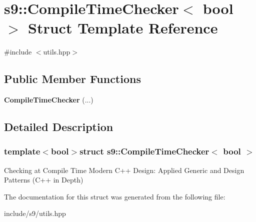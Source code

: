 \hypertarget{structs9_1_1CompileTimeChecker}{\section{s9\-:\-:Compile\-Time\-Checker$<$ bool $>$ Struct Template Reference}
\label{structs9_1_1CompileTimeChecker}
}


{\ttfamily \#include $<$utils.\-hpp$>$}

\subsection*{Public Member Functions}
\begin{DoxyCompactItemize}
\item 
\hypertarget{structs9_1_1CompileTimeChecker_a53515adf153a125605e1df2e41f31e6d}{{\bfseries Compile\-Time\-Checker} (...)}\label{structs9_1_1CompileTimeChecker_a53515adf153a125605e1df2e41f31e6d}

\end{DoxyCompactItemize}


\subsection{Detailed Description}
\subsubsection*{template$<$bool$>$struct s9\-::\-Compile\-Time\-Checker$<$ bool $>$}

Checking at Compile Time Modern C++ Design\-: Applied Generic and Design Patterns (C++ in Depth) 

The documentation for this struct was generated from the following file\-:\begin{DoxyCompactItemize}
\item 
include/s9/utils.\-hpp\end{DoxyCompactItemize}
